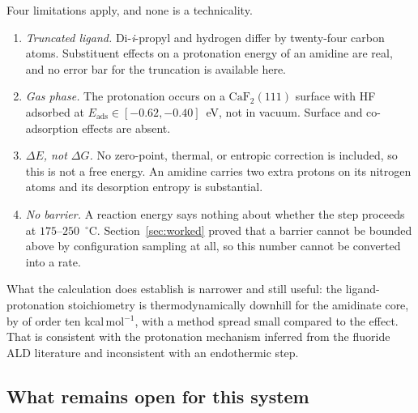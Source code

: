 \begin{remark}
Four limitations apply, and none is a technicality.
\begin{enumerate}
\item \emph{Truncated ligand.} Di-\emph{i}-propyl and hydrogen differ by
twenty-four carbon atoms. Substituent effects on a protonation energy of an
amidine are real, and no error bar for the truncation is available here.
\item \emph{Gas phase.} The protonation occurs on a $\mathrm{CaF_2}(111)$ surface
with HF adsorbed at $E_{\mathrm{ads}} \in[-0.62,-0.40]$~eV, not in vacuum. Surface
and co-adsorption effects are absent.
\item \emph{$\Delta E$, not $\Delta G$.} No zero-point, thermal, or entropic
correction is included, so this is not a free energy. An amidine carries two extra
protons on its nitrogen atoms and its desorption entropy is substantial.
\item \emph{No barrier.} A reaction energy says nothing about whether the step
proceeds at $175$--$250$~$^\circ$C. Section~\ref{sec:worked} proved that a barrier
cannot be bounded above by configuration sampling at all, so this number cannot be
converted into a rate.
\end{enumerate}
What the calculation does establish is narrower and still useful: the
ligand-protonation stoichiometry is thermodynamically downhill for the amidinate
core, by of order ten kcal\,mol$^{-1}$, with a method spread small compared to the
effect. That is consistent with the protonation mechanism inferred from the
fluoride ALD literature and inconsistent with an endothermic step.
\end{remark}

\subsection{What remains open for this system}

